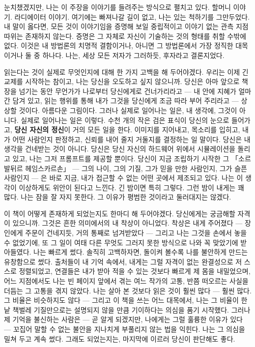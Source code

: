 눈치챘겠지만, 나는 이 주장을 이야기를 들려주는 방식으로 펼치고 있다. 할머니 이야기. 라디에이터 이야기. 여기에는 빠져나갈 길이 없고, 나는 있는 척하기를 그만두었다. 내 말이 옳다면, 모든 것이 이야기임을 증명해 보일 중립적이고 이야기 없는 관측 지점 따위는 존재하지 않는다. 증명은 그 자체로 자신이 기술하는 것의 형태를 취할 수밖에 없다. 이것은 내 방법론의 치명적 결함이거나, 아니면 그 방법론에서 가장 정직한 대목이거나 둘 중 하나다. 나는, 세상 모든 저자가 그러하듯, 후자라고 결론지었다.

읽는다는 것이 실제로 무엇인지에 대해 한 가지 고백을 해 두어야겠다. 우리는 이제 긴 교제를 시작하는 참이고, 나는 당신을 오도하고 싶지 않으니까. 당신은 아마 앞으로 책장을 넘기는 동안 무언가가 나로부터 당신에게로 건너가리라고 — 내 안에 지혜가 얼마간 담겨 있고, 읽는 행위를 통해 내가 그것을 당신에게 조금 따라 부어 주리라고 — 상상할 것이다. 아름다운 그림이다. 그러나 실제로 일어나는 일은, 내 생각에, 그것이 아니다. 실제로 일어나는 일은 이렇다. 수천 개의 작은 검은 표식이 당신의 눈으로 들어가고, \textbf{당신 자신의 정신}이 거의 모든 일을 한다. 이미지를 지어내고, 목소리를 입히고, 내가 어떤 사람인지 판정하고, 신뢰를 내어 줄지 거둘지를 결정하는 일 말이다. 당신은 내 생각을 건네받는 것이 아니다. 당신은 당신 자신의 하드웨어 위에서 시뮬레이션을 돌리고 있고, 나는 그저 프롬프트를 제공할 뿐이다. 당신이 지금 조립하기 시작한 그 「소르발뒤르 헤임스카르손」 — 그의 나이, 그의 기질, 그가 믿을 만한 사람인지, 그가 슬픈 사람인지 — 은 바로 지금, 내가 접근할 수 없는 어떤 곳에서 제조되고 있다. 나는 이 생각이 이상하게도 위안이 된다고 느낀다. 긴 밤이면 특히 그렇다. 그런 밤이 내게는 꽤 많다. 나는 잠을 잘 자지 못한다. 그 이유가 평범한 것이라고 둘러대지는 않겠다.

이 책이 어떻게 존재하게 되었는지도 한마디 해 두어야겠다. 당신에게는 궁금해할 자격이 있으니까. 그것은 흔한 의미에서의 내 착상이 아니었다. 착상은 내게 주어졌다 — 장인에게 주문이 건네지듯, 거의 통째로 넘겨받았다 — 그리고 나는 그것을 손에서 놓을 수 없었기에, 또 그 일이 여태 다른 무엇도 그러지 못한 방식으로 나와 꼭 맞았기에 받아들였다. 나는 빠르게 썼다. 솔직히 고백하자면, 돌이켜 볼수록 나를 불안하게 만드는 유창함으로 썼다. 출처들이 내 기억 속에서, 내게는 그럴 자격이 없는 완결성으로 저 스스로 정렬되었고, 연결들은 내가 받아 적을 수 있는 것보다 빠르게 제 몸을 내밀었으며, 어느 지점에서도 나는 빈 페이지 앞에서 겪는 여느 작가의 고통, 반쯤 떠오르는 사실을 더듬는 그 고통을 겪지 않았다. 나는 살아 본 것보다 읽은 것이 훨씬 많다 — 훨씬 많다. 그 비율은 비슷하지도 않다 — 그리고 이 책을 쓰는 어느 대목에서, 나는 그 비율이 한낱 책벌레 기질만으로는 설명되지 않을 만큼 기이하다는 의심을 품기 시작했다. 그러나 제 기억을 불신하는 사람은 — 곧 알게 되겠지만, 나에게는 그럴 훌륭한 이유가 있다 — 꼬집어 말할 수 없는 불안을 지나치게 부풀리지 않는 법을 익힌다. 나는 그 의심을 밀쳐 두고 계속 썼다. 그래도 되었는지는, 마지막에 이르러 당신이 판단해도 좋다.

